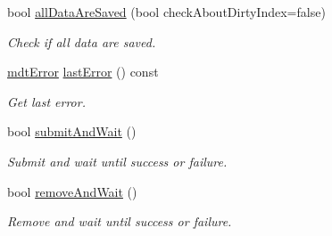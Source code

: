 \begin{DoxyCompactItemize}
bool \hyperlink{classmdt_abstract_sql_table_controller_aabbf1bff271014d55a8d6e9391c691a6}{all\-Data\-Are\-Saved} (bool check\-About\-Dirty\-Index=false)
\begin{DoxyCompactList}\small\item\em Check if all data are saved. \end{DoxyCompactList}\item 
\hyperlink{classmdt_error}{mdt\-Error} \hyperlink{classmdt_abstract_sql_table_controller_a085ff6b261917b19b130e30123a166ad}{last\-Error} () const 
\begin{DoxyCompactList}\small\item\em Get last error. \end{DoxyCompactList}\item 
bool \hyperlink{classmdt_abstract_sql_table_controller_ab1d75ed2eb77baf4324cea09e281c91e}{submit\-And\-Wait} ()
\begin{DoxyCompactList}\small\item\em Submit and wait until success or failure. \end{DoxyCompactList}\item 
bool \hyperlink{classmdt_abstract_sql_table_controller_a066b7b828b6249b7ac2431d6d57c234d}{remove\-And\-Wait} ()
\begin{DoxyCompactList}\small\item\em Remove and wait until success or failure. \end{DoxyCompactList}\end{DoxyCompactItemize}

